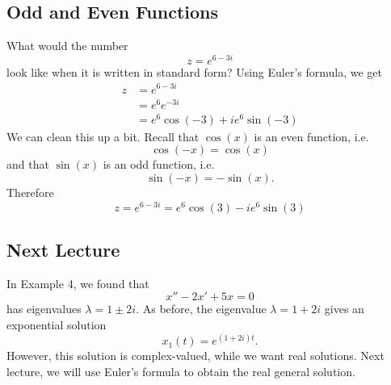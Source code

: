 \documentclass[10pt,letterpaper]{article}
\begin{document}
\subsection{Odd and Even Functions}
What would the number
$$
    z = e^{6-3i}
$$
look like when it is written in standard form? Using Euler's formula, we get 
\begin{align*}
z &= e^{6-3i}\\
 &= e^6e^{-3i}\\
 &= e^6\cos(-3)+ie^6\sin(-3)
\end{align*}
We can clean this up a bit. Recall that $\cos(x)$ is an even function, i.e. 
$$
    \cos(-x) =\cos(x)
$$
and that $\sin(x)$ is an odd function, i.e. 
$$
    \sin(-x) = -\sin(x).
$$
Therefore 
$$
z = e^{6-3i} = e^6\cos(3)-ie^6\sin(3)
$$
\subsection{Next Lecture}
In Example 4, we found that
\[
x''-2x'+5x=0
\]
has eigenvalues $\lambda=1\pm2i$. As before, the eigenvalue
$\lambda=1+2i$ gives an exponential solution
\[
x_1(t)=e^{(1+2i)t}.
\]
However, this solution is complex-valued, while we want real
solutions. Next lecture, we will use Euler's formula to obtain
the real general solution.
\end{document}
